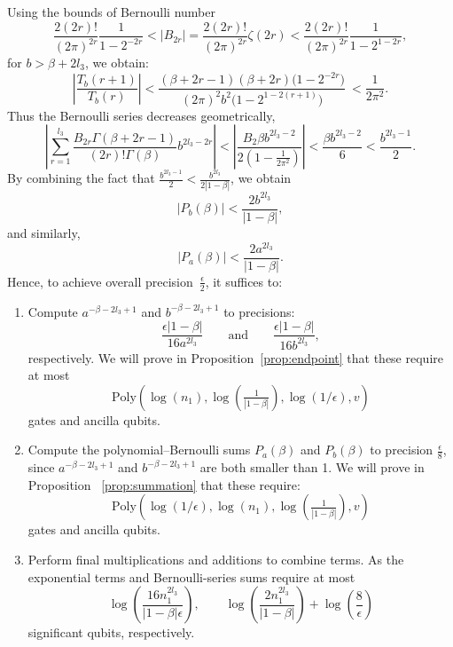 \documentclass[aps,pra,twocolumn,superscriptaddress,preprintnumbers,amsmath,amssymb]{revtex4-2}
\begin{document}
Using the bounds of Bernoulli number
\begin{equation}
    \frac{2(2r)!}{(2\pi)^{2r}}\frac{1}{1-2^{-2r}}< |B_{2r}|=\frac{2(2r)!}{(2\pi)^{2r}}\zeta(2r)<\frac{2(2r)!}{(2\pi)^{2r}}\frac{1}{1-2^{1-2r}},
\end{equation}
for \( b > \beta + 2 l_3 \), we obtain:
\[
\left|\frac{T_b(r+1)}{T_b(r)}\right| <\frac{(\beta+2r-1)(\beta+2r)\bigl(1-2^{-2r}\bigr)}{(2\pi)^2b^2\bigl(1-2^{1-2(r+1)}\bigr)} \
< \frac{1}{2\pi^2}.
\]
Thus the Bernoulli series decreases geometrically, 
\begin{equation}
\left|\sum_{r=1}^{l_3} \frac{B_{2r}\Gamma(\beta+2r-1)}{(2r)!\Gamma(\beta)}b^{2l_3-2r}\right|
< \left|\frac{B_2\beta b^{2l_3-2}}{2\left(1-\frac{1}{2\pi^2}\right)}\right|
< \frac{\beta b^{2l_3-2}}{6}
< \frac{b^{2l_3-1}}{2}.
\end{equation}
By combining the fact that $\frac{b^{2l_3-1}}{2}<\frac{b^{2l_3}}{2|1-\beta|}$, we obtain
\begin{equation}
    |P_b(\beta)|<\frac{2b^{2l_3}}{|1-\beta|},
\end{equation}
and similarly,
\begin{equation}
    |P_a(\beta)|<\frac{2a^{2l_3}}{|1-\beta|}.
\end{equation}
Hence, to achieve overall precision~$\frac{\epsilon}{2}$, it suffices to:
\begin{enumerate}
  \item Compute $a^{-\beta-2l_3+1}$ and $b^{-\beta-2l_3+1}$ to precisions:
  \begin{equation}
      \frac{\epsilon |1-\beta|}{16{a^{2l_3}}}\qquad\text{and}\qquad\frac{\epsilon |1-\beta|}{16{b^{2l_3}}},
  \end{equation}
 respectively. We will prove in Proposition~\ref{prop:endpoint} that these require at most 
 \begin{equation}
     \mathrm{Poly}(\log(n_1),\log(\tfrac{1}{|1-\beta|}),\log(1/\epsilon),v)
 \end{equation}
 gates and ancilla qubits.
\item Compute the  polynomial–Bernoulli sums $P_a(\beta)$ and $P_b(\beta)$ to precision $\frac{\epsilon}{8}$, since $a^{-\beta-2l_3+1}$ and $b^{-\beta-2l_3+1}$ are both smaller than 1.  We will prove in Proposition ~\ref{prop:summation} that these require:
\begin{equation}
    \mathrm{Poly}(\log(1/\epsilon),\log(n_1),\log(\tfrac{1}{|1-\beta|}),v)
\end{equation}
gates and ancilla qubits.  
\item Perform final multiplications and additions to combine terms. As the exponential terms and Bernoulli-series sums require at most
\[
    \log(\frac{16n_1^{2l_3}}{|1-\beta|\epsilon}),\qquad \log(\frac{2n_1^{2l_3}}{|1-\beta|})+\log(\frac{8}{\epsilon})
\]
significant qubits, respectively. 
\end{enumerate}
\end{document}
